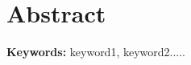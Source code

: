 
\chapter*{Abstract}
  
    


  
    
\par
\vspace{0.5in}    
    
\noindent
{\bf Keywords:} keyword1, keyword2.....



  